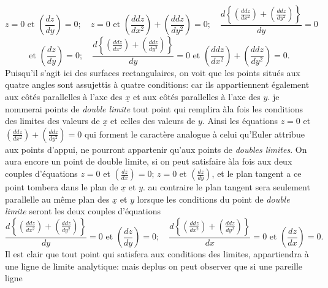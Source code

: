 \documentclass[11pt,a4paper]{article}
\begin{document}

\[ z=0 \text{ et } \left(\frac{dz}{dy}\right)=0; \quad z=0 \text{ et } \left(\frac{ddz}{dx^2}\right) + \left(\frac{ddz}{dy^2}\right) = 0; \quad \frac{d\left\{\left(\frac{ddz}{dx^2}\right) + \left(\frac{ddz}{dy^2}\right)\right\}}{dy} = 0 \]
\[ \text{et } \left(\frac{dz}{dy}\right)=0; \quad \frac{d\left\{\left(\frac{ddz}{dx^2}\right) + \left(\frac{ddz}{dy^2}\right)\right\}}{dy} = 0 \text{ et } \left(\frac{ddz}{dx^2}\right) + \left(\frac{ddz}{dy^2}\right) = 0. \]
Puisqu'il s'agit ici des surfaces rectangulaires, on voit que
les points situés aux quatre angles sont assujettis à quatre
conditions:  car ils appartiennent également aux côtés parallelles
à l'axe des $\underline{x}$ et aux côtés parallelles à l'axe des $y$.
je  nommerai points de \emph{double limite} tout point
qui remplira àla fois les conditions des limites des valeurs
de $\underline{x}$ et celles des valeurs de $y$. Ainsi les équations
$z=0$ et $\left(\frac{ddz}{dx^2}\right) + \left(\frac{ddz}{dy^2}\right) = 0$ qui forment le caractère analogue
à celui qu'Euler attribue aux points d'appui, ne pourront
appartenir qu'aux points de \emph{doubles limites}.  On aura encore un point de double limite, si on
peut satisfaire àla fois aux deux couples d'équations
$z=0$ et $\left(\frac{dz}{dx}\right)=0$; $z=0$ et $\left(\frac{dz}{dy}\right)$, et le plan tangent a
ce point tombera dans le plan de $\underline{x}$ et $y$.
au contraire le plan tangent sera seulement parallelle au
même plan des $\underline{x}$ et $y$ lorsque les conditions du
point de \emph{double limite} seront les deux couples d'équations
\[ \frac{d\left\{\left(\frac{ddz}{dx^2}\right) + \left(\frac{ddz}{dy^2}\right)\right\}}{dy} = 0 \text{ et } \left(\frac{dz}{dy}\right) = 0; \quad \frac{d\left\{\left(\frac{ddz}{dx^2}\right) + \left(\frac{ddz}{dy^2}\right)\right\}}{dx} = 0 \text{ et } \left(\frac{dz}{dx}\right) = 0. \]
Il est clair que tout point qui satisfera aux conditions
des limites, appartiendra à une ligne de limite analytique:
mais deplus on peut observer que si une pareille ligne
\end{document}
